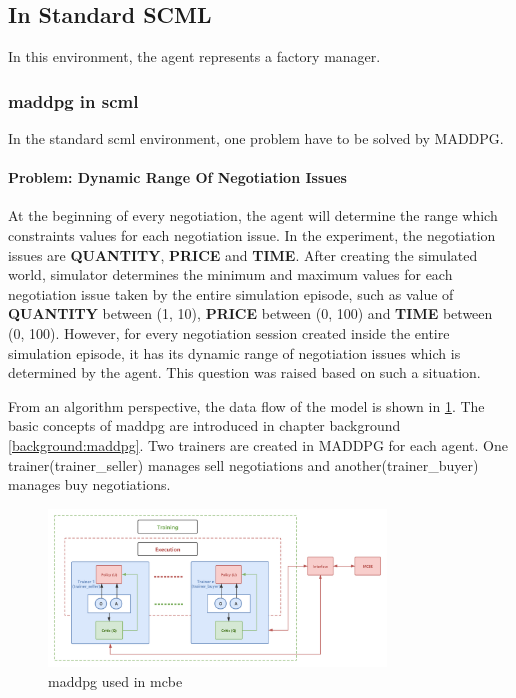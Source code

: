 \subsection{In Standard SCML}
In this environment, the agent represents a factory manager.

\subsubsection{\gls{maddpg} in \gls{scml}} \label{methods:maddpg}
In the standard scml environment, one problem have to be solved by MADDPG.

\paragraph{Problem: Dynamic Range Of Negotiation Issues}At the beginning of every negotiation, the agent will determine the range which constraints values for each negotiation issue. In the experiment, the negotiation issues are \textbf{QUANTITY}, \textbf{PRICE} and \textbf{TIME}. After creating the simulated world, simulator determines the minimum and maximum values for each negotiation issue taken by the entire simulation episode, such as value of \textbf{QUANTITY} between (1, 10), \textbf{PRICE} between (0, 100) and \textbf{TIME} between (0, 100). However, for every negotiation session created inside the entire simulation episode, it has its dynamic range of negotiation issues which is determined by the agent. This question was raised based on such a situation.

From an algorithm perspective, the data flow of the model is shown in \ref{fig:method-maddpg-scml}. The basic concepts of \gls{maddpg} are introduced in chapter background \ref{background:maddpg}. Two trainers are created in MADDPG for each agent. One trainer(trainer\_seller) manages sell negotiations and another(trainer\_buyer) manages buy negotiations. 

\begin{figure}[htbp]
\centering
\includegraphics[width=0.80\textwidth]{./images/scml-maddpg.png}
\caption{\gls{maddpg} used in \gls{mcbe}}
\label{fig:method-maddpg-scml}
\end{figure}


